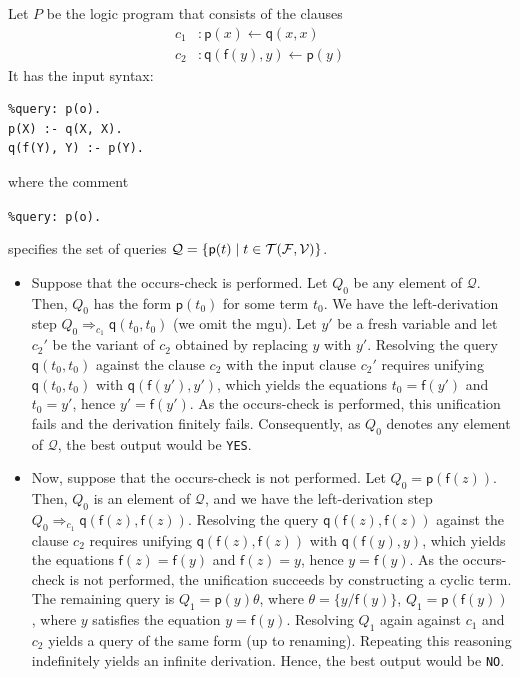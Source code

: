 \begin{example}\label{ex:lp-occurs-check:competition}
  Let $P$ be the logic program that consists of the clauses
  \begin{align*}
    c_1 &: \mathsf{p}(x) \leftarrow \mathsf{q}(x,x) \\
    c_2 &: \mathsf{q}(\mathsf{f}(y),y) \leftarrow \mathsf{p}(y)
  \end{align*}
  It has the input syntax:
  \begin{verbatim}
%query: p(o).
p(X) :- q(X, X).
q(f(Y), Y) :- p(Y).
  \end{verbatim}
  where the comment
  \begin{center}
    \texttt{\%query: p(o).}
  \end{center}
  specifies the set of queries
  $\mathcal{Q} = \left\{\mathsf{p}(t) \mid
  t \in \mathcal{T}(\mathcal{F},\mathcal{V})\right\}$.
  \begin{itemize}
    \item Suppose that the occurs-check is performed.
    Let $Q_0$ be any element of $\mathcal{Q}$. Then, $Q_0$ has the form
    $\mathsf{p}(t_0)$ for some term $t_0$.
    We have the left-derivation step
    $Q_0 \Rightarrow_{c_1} \mathsf{q}(t_0,t_0)$
    (we omit the mgu). Let $y'$ be a fresh variable
    and let $c_2'$ be the variant of $c_2$ obtained by
    replacing $y$ with $y'$.
    Resolving the query $\mathsf{q}(t_0,t_0)$ against the clause
    $c_2$ with the input clause $c_2'$ requires unifying $\mathsf{q}(t_0,t_0)$
    with $\mathsf{q}(\mathsf{f}(y'),y')$, which yields the equations
    $t_0=\mathsf{f}(y')$ and $t_0=y'$, hence $y'=\mathsf{f}(y')$.
    As the occurs-check is performed, this unification fails and
    the derivation finitely fails.
    Consequently, as $Q_0$ denotes any element of $\mathcal{Q}$,
    the best output would be \texttt{YES}.

    \item Now, suppose that the occurs-check is not performed.
    Let $Q_0 = \mathsf{p}(\mathsf{f}(z))$. Then, $Q_0$ is an element
    of $\mathcal{Q}$, and we have the left-derivation step
    $Q_0 \Rightarrow_{c_1} \mathsf{q}(\mathsf{f}(z),\mathsf{f}(z))$.
    Resolving the query $\mathsf{q}(\mathsf{f}(z),\mathsf{f}(z))$
    against the clause $c_2$ requires unifying
    $\mathsf{q}(\mathsf{f}(z),\mathsf{f}(z))$ with
    $\mathsf{q}(\mathsf{f}(y),y)$, which yields the equations
    $\mathsf{f}(z)=\mathsf{f}(y)$ and $\mathsf{f}(z)=y$,
    hence $y=\mathsf{f}(y)$.
    As the occurs-check is not performed, the unification succeeds
    by constructing a cyclic term. The remaining query is
    $Q_1 = \mathsf{p}(y)\theta$, where $\theta=\{y/\mathsf{f}(y)\}$,
    \ie $Q_1 = \mathsf{p}(\mathsf{f}(y))$,
    where $y$ satisfies the equation $y=\mathsf{f}(y)$.    
    Resolving $Q_1$ again against $c_1$ and $c_2$ yields a query
    of the same form (up to renaming). Repeating this reasoning
    indefinitely yields an infinite derivation.
    Hence, the best output would be \texttt{NO}.
  \end{itemize}
\end{example}